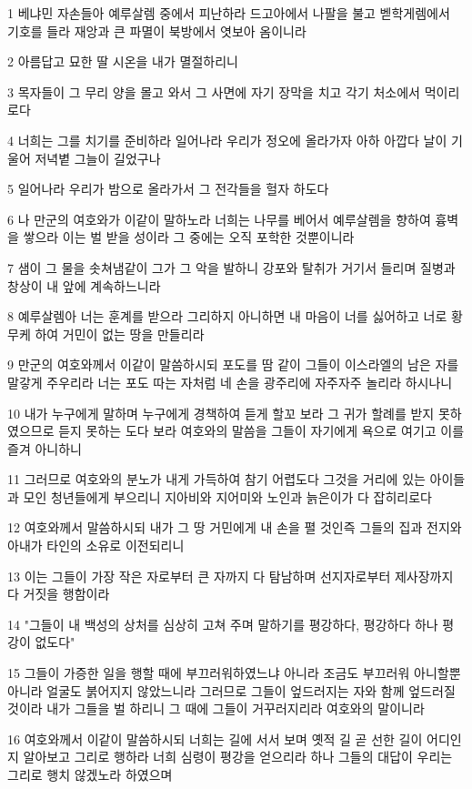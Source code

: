 \par 1 베냐민 자손들아 예루살렘 중에서 피난하라 드고아에서 나팔을 불고 벧학게렘에서 기호를 들라 재앙과 큰 파멸이 북방에서 엿보아 옴이니라
\par 2 아름답고 묘한 딸 시온을 내가 멸절하리니
\par 3 목자들이 그 무리 양을 몰고 와서 그 사면에 자기 장막을 치고 각기 처소에서 먹이리로다
\par 4 너희는 그를 치기를 준비하라 일어나라 우리가 정오에 올라가자 아하 아깝다 날이 기울어 저녁볕 그늘이 길었구나
\par 5 일어나라 우리가 밤으로 올라가서 그 전각들을 헐자 하도다
\par 6 나 만군의 여호와가 이같이 말하노라 너희는 나무를 베어서 예루살렘을 향하여 흉벽을 쌓으라 이는 벌 받을 성이라 그 중에는 오직 포학한 것뿐이니라
\par 7 샘이 그 물을 솟쳐냄같이 그가 그 악을 발하니 강포와 탈취가 거기서 들리며 질병과 창상이 내 앞에 계속하느니라
\par 8 예루살렘아 너는 훈계를 받으라 그리하지 아니하면 내 마음이 너를 싫어하고 너로 황무케 하여 거민이 없는 땅을 만들리라
\par 9 만군의 여호와께서 이같이 말씀하시되 포도를 땀 같이 그들이 이스라엘의 남은 자를 말갛게 주우리라 너는 포도 따는 자처럼 네 손을 광주리에 자주자주 놀리라 하시나니
\par 10 내가 누구에게 말하며 누구에게 경책하여 듣게 할꼬 보라 그 귀가 할례를 받지 못하였으므로 듣지 못하는 도다 보라 여호와의 말씀을 그들이 자기에게 욕으로 여기고 이를 즐겨 아니하니
\par 11 그러므로 여호와의 분노가 내게 가득하여 참기 어렵도다 그것을 거리에 있는 아이들과 모인 청년들에게 부으리니 지아비와 지어미와 노인과 늙은이가 다 잡히리로다
\par 12 여호와께서 말씀하시되 내가 그 땅 거민에게 내 손을 펼 것인즉 그들의 집과 전지와 아내가 타인의 소유로 이전되리니
\par 13 이는 그들이 가장 작은 자로부터 큰 자까지 다 탐남하며 선지자로부터 제사장까지 다 거짓을 행함이라
\par 14 "그들이 내 백성의 상처를 심상히 고쳐 주며 말하기를 평강하다, 평강하다 하나 평강이 없도다"
\par 15 그들이 가증한 일을 행할 때에 부끄러워하였느냐 아니라 조금도 부끄러워 아니할뿐 아니라 얼굴도 붉어지지 않았느니라 그러므로 그들이 엎드러지는 자와 함께 엎드러질 것이라 내가 그들을 벌 하리니 그 때에 그들이 거꾸러지리라 여호와의 말이니라
\par 16 여호와께서 이같이 말씀하시되 너희는 길에 서서 보며 옛적 길 곧 선한 길이 어디인지 알아보고 그리로 행하라 너희 심령이 평강을 얻으리라 하나 그들의 대답이 우리는 그리로 행치 않겠노라 하였으며
